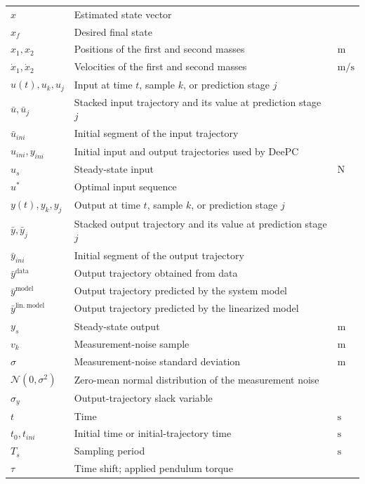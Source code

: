 \documentclass[12pt,a4paper]{report}
\begin{document}
\begin{longtable}{@{}p{}p{}p{}@{}}
$\hat{x}$ & Estimated state vector & \\
$x_f$ & Desired final state & \\
$x_1, x_2$ & Positions of the first and second masses & $\mathrm{m}$ \\
$\dot{x}_1, \dot{x}_2$ & Velocities of the first and second masses & $\mathrm{m/s}$ \\
$u(t), u_k, u_j$ & Input at time $t$, sample $k$, or prediction stage $j$ & \\
$\bar{u}, \bar{u}_j$ & Stacked input trajectory and its value at prediction stage $j$ & \\
$\bar{u}_{ini}$ & Initial segment of the input trajectory & \\
$u_{ini}, y_{ini}$ & Initial input and output trajectories used by DeePC & \\
$u_s$ & Steady-state input & $\mathrm{N}$ \\
$u^*$ & Optimal input sequence & \\
$y(t), y_k, y_j$ & Output at time $t$, sample $k$, or prediction stage $j$ & \\
$\bar{y}, \bar{y}_j$ & Stacked output trajectory and its value at prediction stage $j$ & \\
$\bar{y}_{ini}$ & Initial segment of the output trajectory & \\
$\bar{y}^{\mathrm{data}}$ & Output trajectory obtained from data & \\
$\bar{y}^{\mathrm{model}}$ & Output trajectory predicted by the system model & \\
$\bar{y}^{\mathrm{lin.\ model}}$ & Output trajectory predicted by the linearized model & \\
$y_s$ & Steady-state output & $\mathrm{m}$ \\
$v_k$ & Measurement-noise sample & $\mathrm{m}$ \\
$\sigma$ & Measurement-noise standard deviation & $\mathrm{m}$ \\
$\mathcal{N}(0,\sigma^2)$ & Zero-mean normal distribution of the measurement noise & \\
$\sigma_y$ & Output-trajectory slack variable & \\
$t$ & Time & $\mathrm{s}$ \\
$t_0, t_{ini}$ & Initial time or initial-trajectory time & $\mathrm{s}$ \\
$T_s$ & Sampling period & $\mathrm{s}$ \\
$\tau$ & Time shift; applied pendulum torque & \\

\end{longtable}
\end{document}
